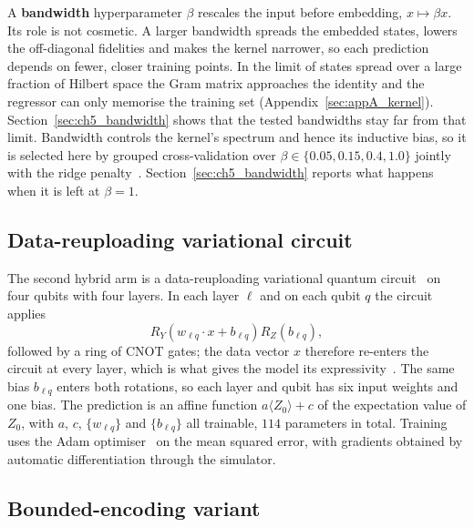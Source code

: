 \documentclass[Thesis.tex]{subfiles}
\begin{document}
A \textbf{bandwidth} hyperparameter $\beta$ rescales the input before embedding,
$x \mapsto \beta x$. Its role is not cosmetic. A larger bandwidth spreads the embedded
states, lowers the off-diagonal fidelities and makes the kernel narrower, so each
prediction depends on fewer, closer training points. In the limit of states spread
over a large fraction of Hilbert space the Gram matrix approaches the identity and the
regressor can only memorise the training set (Appendix~\ref{sec:appA_kernel}).
Section~\ref{sec:ch5_bandwidth} shows that the tested bandwidths stay far from that
limit. Bandwidth controls the kernel's spectrum
and hence its inductive bias, so it is selected here by grouped cross-validation
over $\beta \in \{0.05, 0.15, 0.4, 1.0\}$ jointly with the ridge
penalty~\cite{shaydulin2022importance,canatar2023bandwidth}.
Section~\ref{sec:ch5_bandwidth} reports what happens when it is left at $\beta = 1$.

\subsection{Data-reuploading variational circuit}

The second hybrid arm is a data-reuploading variational quantum
circuit~\cite{perezsalinas2020reuploading} on four
qubits with four layers. In each layer $\ell$ and on each qubit $q$ the circuit
applies
\begin{equation}
    R_Y\!\left( w_{\ell q} \cdot x + b_{\ell q} \right) R_Z\!\left( b_{\ell q} \right),
    \label{eq:ch3_reupload}
\end{equation}
followed by a ring of CNOT gates; the data vector $x$ therefore re-enters the circuit
at every layer, which is what gives the model its expressivity~\cite{schuld2021effect}.
The same bias $b_{\ell q}$ enters both rotations, so each layer and qubit has six
input weights and one bias. The prediction is an
affine function $a \langle Z_0 \rangle + c$ of the expectation value of $Z_0$, with
$a$, $c$, $\{w_{\ell q}\}$ and $\{b_{\ell q}\}$ all trainable, $114$ parameters in total.
Training uses the Adam optimiser~\cite{kingma2015adam} on the mean squared error, with gradients obtained by automatic
differentiation through the simulator.

\subsection{Bounded-encoding variant}\label{sec:ch3_bounded}
\end{document}
